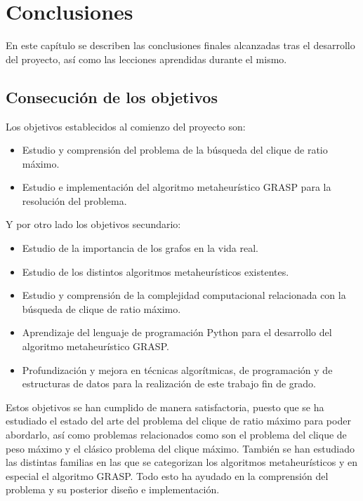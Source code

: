 
\chapter{Conclusiones} %

\label{Chapter6} %


En este capítulo se describen las conclusiones finales alcanzadas tras el desarrollo del proyecto, así como las lecciones aprendidas durante el mismo.

\section{Consecución de los objetivos}

Los objetivos establecidos al comienzo del proyecto son:

\begin{itemize}
	\item Estudio y comprensión del problema de la búsqueda del clique de ratio máximo.
	\item Estudio e implementación del algoritmo metaheurístico \gls{GRASP} para la resolución del problema.
\end{itemize}

Y por otro lado los objetivos secundario:
\begin{itemize}
	\item Estudio de la importancia de los grafos en la vida real.
	\item Estudio de los distintos algoritmos metaheurísticos existentes.
	\item Estudio y comprensión de la complejidad computacional relacionada con la búsqueda de clique de ratio máximo.
	\item Aprendizaje del lenguaje de programación Python para el desarrollo del algoritmo metaheurístico \gls{GRASP}.
	\item Profundización y mejora en técnicas algorítmicas, de programación y de estructuras de datos para la realización de este trabajo fin de grado.
\end{itemize}

Estos objetivos se han cumplido de manera satisfactoria, puesto que se ha estudiado el estado del arte del problema del clique de ratio máximo para poder abordarlo, así como problemas relacionados como son el problema del clique de peso máximo y el clásico problema del clique máximo.
También se han estudiado las distintas familias en las que se categorizan los algoritmos metaheurísticos y en especial el algoritmo \gls{GRASP}.
Todo esto ha ayudado en la comprensión del problema y su posterior diseño e implementación.

